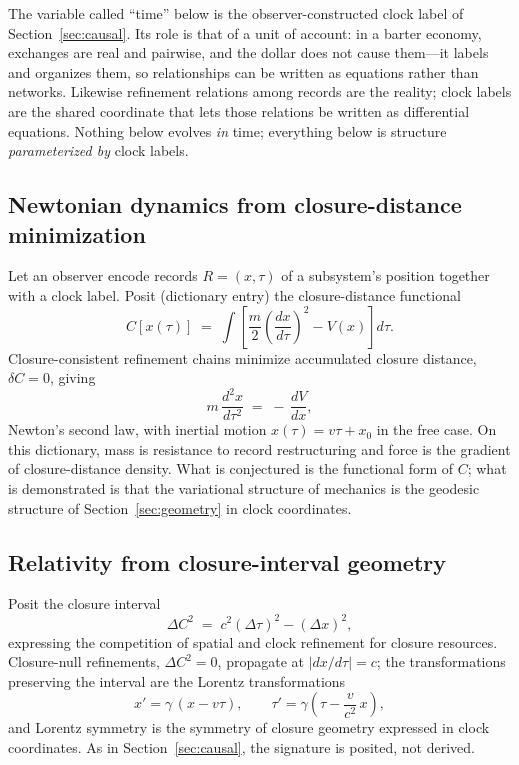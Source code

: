 \documentclass[11pt]{article}
\theoremstyle{definition}
\theoremstyle{remark}
\begin{document}
The variable called ``time'' below is the observer-constructed clock label of Section~\ref{sec:causal}. Its role is that of a unit of account: in a barter economy, exchanges are real and pairwise, and the dollar does not cause them---it labels and organizes them, so relationships can be written as equations rather than networks. Likewise refinement relations among records are the reality; clock labels are the shared coordinate that lets those relations be written as differential equations. Nothing below evolves \emph{in} time; everything below is structure \emph{parameterized by} clock labels.

\subsection{Newtonian dynamics from closure-distance minimization}
Let an observer encode records $R = (x, \tau)$ of a subsystem's position together with a clock label. Posit (dictionary entry) the closure-distance functional
\[ C[x(\tau)] \;=\; \int \left[ \frac{m}{2}\left(\frac{dx}{d\tau}\right)^{\!2} - V(x) \right] d\tau . \]
Closure-consistent refinement chains minimize accumulated closure distance, $\delta C = 0$, giving
\[ m\,\frac{d^2 x}{d\tau^2} \;=\; -\,\frac{dV}{dx} , \]
Newton's second law, with inertial motion $x(\tau) = v\tau + x_0$ in the free case. On this dictionary, mass is resistance to record restructuring and force is the gradient of closure-distance density. What is conjectured is the functional form of $C$; what is demonstrated is that the variational structure of mechanics is the geodesic structure of Section~\ref{sec:geometry} in clock coordinates.

\subsection{Relativity from closure-interval geometry}
Posit the closure interval
\[ \Delta C^2 \;=\; c^2 (\Delta\tau)^2 - (\Delta x)^2 , \]
expressing the competition of spatial and clock refinement for closure resources. Closure-null refinements, $\Delta C^2 = 0$, propagate at $|dx/d\tau| = c$; the transformations preserving the interval are the Lorentz transformations
\[ x' = \gamma\,(x - v\tau), \qquad \tau' = \gamma\left(\tau - \frac{v}{c^2}\,x\right), \]
and Lorentz symmetry is the symmetry of closure geometry expressed in clock coordinates. As in Section~\ref{sec:causal}, the signature is posited, not derived.
\end{document}
